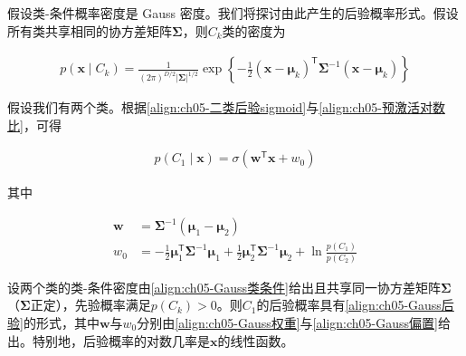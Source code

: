 \documentclass[../../main.tex]{subfiles}
\begin{document}
假设类-条件概率密度是 Gauss 密度。我们将探讨由此产生的后验概率形式。假设所有类共享相同的协方差矩阵$\boldsymbol{\Sigma}$，则$C_k$类的密度为

\begin{align}
  p(\boldsymbol{x}\mid C_k)=\frac{1}{(2\pi)^{D/2}\lvert\boldsymbol{\Sigma}\rvert^{1/2}}\exp\left\{-\frac{1}{2}(\boldsymbol{x}-\boldsymbol{\mu}_k)^{\mathsf{T}}\boldsymbol{\Sigma}^{-1}(\boldsymbol{x}-\boldsymbol{\mu}_k)\right\}
  \label{align:ch05-Gauss类条件}
\end{align}

假设我们有两个类。根据\eqref{align:ch05-二类后验sigmoid}与\eqref{align:ch05-预激活对数比}，可得

\begin{align}
  p(C_1\mid\boldsymbol{x})=\sigma(\boldsymbol{w}^{\mathsf{T}}\boldsymbol{x}+w_0)
  \label{align:ch05-Gauss后验}
\end{align}

其中

\begin{align}
  \boldsymbol{w}&=\boldsymbol{\Sigma}^{-1}(\boldsymbol{\mu}_1-\boldsymbol{\mu}_2)
  \label{align:ch05-Gauss权重}\\
  w_0&=-\frac{1}{2}\boldsymbol{\mu}_1^{\mathsf{T}}\boldsymbol{\Sigma}^{-1}\boldsymbol{\mu}_1+\frac{1}{2}\boldsymbol{\mu}_2^{\mathsf{T}}\boldsymbol{\Sigma}^{-1}\boldsymbol{\mu}_2+\ln\frac{p(C_1)}{p(C_2)}
  \label{align:ch05-Gauss偏置}
\end{align}

\begin{proposition}\label{proposition:ch05-Gauss线性后验}
设两个类的类-条件密度由\eqref{align:ch05-Gauss类条件}给出且共享同一协方差矩阵$\boldsymbol{\Sigma}$（$\boldsymbol{\Sigma}$正定），先验概率满足$p(C_k)>0$。则$C_1$的后验概率具有\eqref{align:ch05-Gauss后验}的形式，其中$\boldsymbol{w}$与$w_0$分别由\eqref{align:ch05-Gauss权重}与\eqref{align:ch05-Gauss偏置}给出。特别地，后验概率的对数几率是$\boldsymbol{x}$的线性函数。
\end{proposition}
\end{document}
